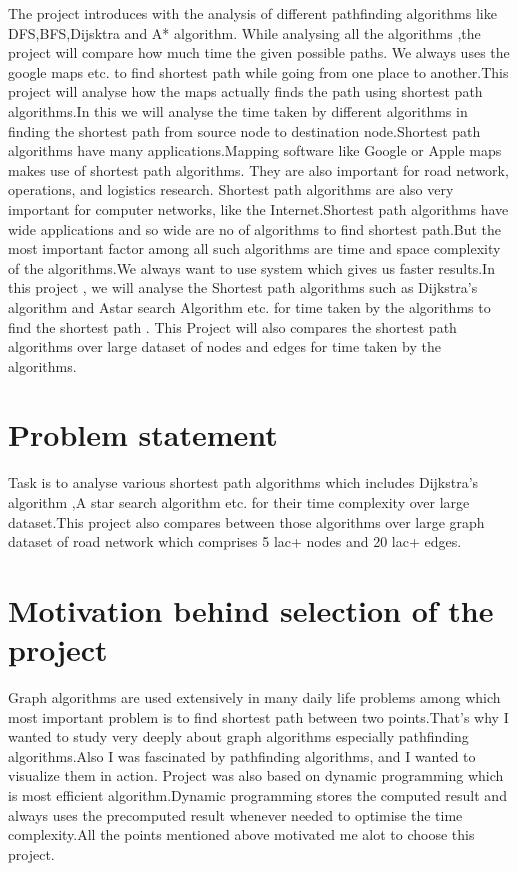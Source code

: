 \documentclass[14pt,a4]{extreport}
\begin{document}
The project introduces with the analysis of different pathfinding algorithms like DFS,BFS,Dijsktra and A* algorithm.
While analysing all the algorithms ,the project will compare how much time the given possible paths.
We always uses the google maps etc. to find shortest path while going from one place to another.This project will analyse how the maps actually finds the path using shortest path algorithms.In this we will analyse the time taken by different algorithms in finding the shortest path from source node to destination node.Shortest path algorithms have many applications.Mapping software like Google or Apple maps makes use of shortest path algorithms. They are also important for road network, operations, and logistics research. Shortest path algorithms are also very important for computer networks, like the Internet.Shortest path algorithms have wide applications and so wide are no of algorithms to find shortest path.But the most important factor among all such algorithms are time and space complexity of the algorithms.We always want to use system which gives us faster results.In this project , we will analyse the Shortest path algorithms such as Dijkstra's algorithm and Astar search Algorithm etc. for time taken by the algorithms to find the shortest path . This Project will also compares the shortest path algorithms over large dataset of nodes and edges for time taken by the algorithms. 
\section {Problem statement}

Task is to analyse various shortest path algorithms which includes Dijkstra's algorithm ,A star search algorithm etc. for their time complexity over large dataset.This project also compares between those algorithms over large graph dataset of road network which comprises 5 lac+ nodes and 20 lac+ edges.

\section {Motivation behind selection of the project}
Graph algorithms are used extensively in many daily life problems among which most important problem is to find shortest path between two points.That's why I wanted to study very deeply about graph algorithms especially pathfinding algorithms.Also I was fascinated by pathfinding algorithms, and I wanted to visualize them in action. Project was also based on dynamic programming which is most efficient algorithm.Dynamic programming stores the computed result and always uses the precomputed result whenever needed to optimise the time complexity.All the points mentioned above motivated me alot to choose this project.
\end{document}
